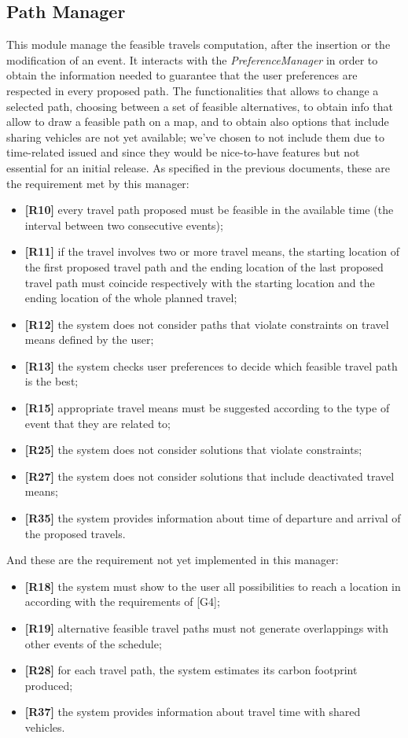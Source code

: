 \subsection{Path Manager}
This module manage the feasible travels computation, after the insertion or the modification of an event. It interacts with the \textit{PreferenceManager} in order to obtain the information needed to guarantee that the user preferences are respected in every proposed path.
The functionalities that allows to change a selected path, choosing between a set of feasible alternatives, to obtain info that allow to draw a feasible path on a map, and to obtain also options that include sharing vehicles are not yet available; we've chosen to not include them due to time-related issued and since they would be nice-to-have features but not essential for an initial release.
As specified in the previous documents, these are the requirement met by this manager:
\begin{itemize}
	\item \textbf{[R10]} every travel path proposed must be feasible in the available time (the interval between two consecutive events);
	\item \textbf{[R11]} if the travel involves two or more travel means, the starting location of the first proposed travel path and the ending location of the last proposed travel path must coincide respectively with the starting location and the ending location of the whole planned travel;
	\item \textbf{[R12]} the system does not consider paths that violate constraints on travel means defined by the user;
	\item \textbf{[R13]} the system checks user preferences to decide which feasible travel path is the best;
	\item \textbf{[R15]} appropriate travel means must be suggested according to the type of event that they are related to;
	\item \textbf{[R25]} the system does not consider solutions that violate constraints;
	\item \textbf{[R27]} the system does not consider solutions that include deactivated travel means;
	\item \textbf{[R35]} the system provides information about time of departure and arrival of the proposed travels.
\end{itemize}
And these are the requirement not yet implemented in this manager:
\begin{itemize}
	\item \textbf{[R18]} the system must show to the user all possibilities to reach a location in according with the requirements of [G4];
	\item \textbf{[R19]} alternative feasible travel paths must not generate overlappings with other events of the schedule;
	\item \textbf{[R28]} for each travel path, the system estimates its carbon footprint produced;
	\item \textbf{[R37]} the system provides information about travel time with shared vehicles.
\end{itemize}

